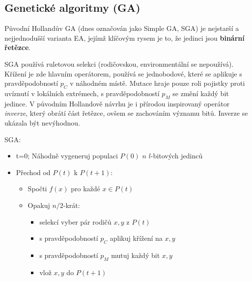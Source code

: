 \subsection{Genetické algoritmy (GA)}
Původní Hollandův GA (dnes označován jako Simple GA, SGA) je nejstarší a nejjednodušší varianta EA, jejímž klíčovým rysem je to, že jedinci jsou \textbf{binární řetězce}.

SGA používá ruletovou selekci (rodičovskou, environmentální se nepoužívá). Křížení je zde hlavním operátorem, používá se jednobodové, které se aplikuje s pravděpodobností $p_C$ v náhodném místě. Mutace hraje pouze roli pojistky proti uvíznutí v lokálních extrémech, s pravděpodobností $p_M$ se změní každý bit jedince. V původním Hollandově návrhu je i přírodou inspirovaný operátor \textit{inverze}, který obrátí část řetězce, ovšem se zachováním významu bitů. Inverze se ukázala být nevýhodnou.

SGA:
\begin{itemize}
  \item t=0; Náhodně vygeneruj populaci $P(0)$ $n$ $l$-bitových jedinců
  \item Přechod od $P(t)$ k $P(t+1)$:
    \begin{itemize}
      \item Spočti $f(x)$ pro každé $x \in P(t)$
      \item Opakuj $n/2$-krát:
        \begin{itemize}
          \item selekcí vyber pár rodičů $x,y$ z $P(t)$
          \item s pravděpodobností $p_C$ aplikuj křížení na $x,y$
          \item s pravděpodobností $p_M$ mutuj každý bit $x,y$
          \item vlož $x,y$ do $P(t+1)$
        \end{itemize}
    \end{itemize}
\end{itemize}


